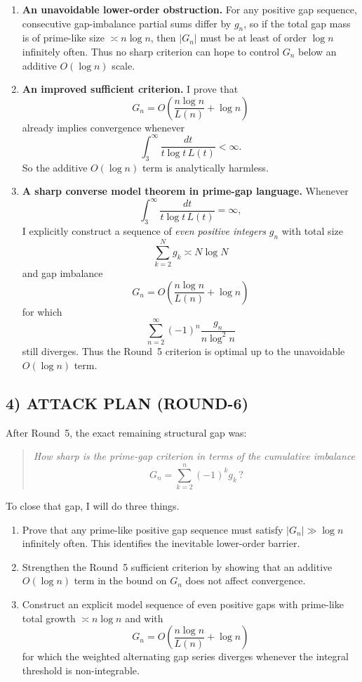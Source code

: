 \begin{enumerate}
\item \textbf{An unavoidable lower-order obstruction.}
For any positive gap sequence, consecutive gap-imbalance partial sums differ by \(g_n\), so if the total gap mass is of prime-like size \(\asymp n\log n\), then \(|G_n|\) must be at least of order \(\log n\) infinitely often.
Thus no sharp criterion can hope to control \(G_n\) below an additive \(O(\log n)\) scale.

\item \textbf{An improved sufficient criterion.}
I prove that
\[
G_n = O\!\left(\frac{n\log n}{L(n)}+\log n\right)
\]
already implies convergence whenever
\[
\int_3^\infty \frac{dt}{t\log t\,L(t)}<\infty.
\]
So the additive \(O(\log n)\) term is analytically harmless.

\item \textbf{A sharp converse model theorem in prime-gap language.}
Whenever
\[
\int_3^\infty \frac{dt}{t\log t\,L(t)}=\infty,
\]
I explicitly construct a sequence of \emph{even positive integers} \(g_n\) with total size
\[
\sum_{k=2}^N g_k \asymp N\log N
\]
and gap imbalance
\[
G_n = O\!\left(\frac{n\log n}{L(n)}+\log n\right)
\]
for which
\[
\sum_{n=2}^\infty (-1)^n \frac{g_n}{n\log^2 n}
\]
still diverges.
Thus the Round~5 criterion is optimal up to the unavoidable \(O(\log n)\) term.
\end{enumerate}

\subsection*{4) ATTACK PLAN (ROUND-6)}

After Round~5, the exact remaining structural gap was:

\begin{quote}
\emph{How sharp is the prime-gap criterion in terms of the cumulative imbalance}
\[
G_n=\sum_{k=2}^n (-1)^k g_k\,?
\]
\end{quote}

To close that gap, I will do three things.

\begin{enumerate}
\item Prove that any prime-like positive gap sequence must satisfy \(|G_n|\gg \log n\) infinitely often.
This identifies the inevitable lower-order barrier.

\item Strengthen the Round~5 sufficient criterion by showing that an additive \(O(\log n)\) term in the bound on \(G_n\) does not affect convergence.

\item Construct an explicit model sequence of even positive gaps with prime-like total growth \(\asymp n\log n\) and with
\[
G_n = O\!\left(\frac{n\log n}{L(n)}+\log n\right)
\]
for which the weighted alternating gap series diverges whenever the integral threshold is non-integrable.
\end{enumerate}

